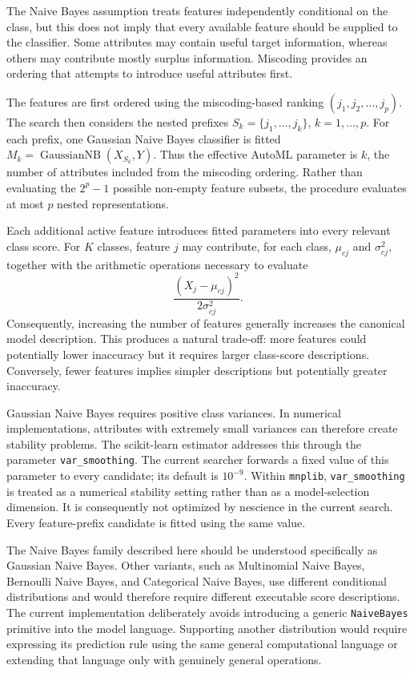 The Naive Bayes assumption treats features independently conditional on the class, but this does not imply that every available feature should be supplied to the classifier. Some attributes may contain useful target information, whereas others may contribute mostly surplus information. Miscoding provides an ordering that attempts to introduce useful attributes first.

The features are first ordered using the miscoding-based ranking $(j_1,j_2,\ldots,j_p)$. The search then considers the nested prefixes $S_k = \{j_1,\ldots,j_k\}$, $k=1,\ldots,p$. For each prefix, one Gaussian Naive Bayes classifier is fitted $M_k = \operatorname{GaussianNB}(X_{S_k},Y)$. Thus the effective AutoML parameter is $k$, the number of attributes included from the miscoding ordering. Rather than evaluating the  $2^p-1$ possible non-empty feature subsets, the procedure evaluates at most $p$ nested representations.

Each additional active feature introduces fitted parameters into every relevant class score. For $K$ classes, feature \(j\) may contribute, for each class, $\mu_{cj}$ and $\sigma_{cj}^{2}$, together with the arithmetic operations necessary to evaluate
\[
\frac{(X_j-\mu_{cj})^2}{2\sigma_{cj}^{2}}.
\]
Consequently, increasing the number of features generally increases the canonical model description. This produces a natural trade-off: more features could potentially lower inaccuracy but it requires larger class-score descriptions. Conversely, fewer features implies simpler descriptions but potentially greater inaccuracy.

Gaussian Naive Bayes requires positive class variances. In numerical implementations, attributes with extremely small variances can therefore create stability problems. The scikit-learn estimator addresses this through the parameter \texttt{var\_smoothing}. The current searcher forwards a fixed value of this parameter to every candidate; its default is $10^{-9}$. Within \texttt{mnplib}, \texttt{var\_smoothing} is treated as a numerical
stability setting rather than as a model-selection dimension. It is consequently not optimized by nescience in the current search. Every feature-prefix candidate is fitted using the same value.

The Naive Bayes family described here should be understood specifically as Gaussian Naive Bayes. Other variants, such as Multinomial Naive Bayes, Bernoulli Naive Bayes, and Categorical Naive Bayes, use different conditional distributions and would therefore require different executable score descriptions. The current implementation deliberately avoids introducing a generic \texttt{NaiveBayes} primitive into the model language. Supporting another distribution would require expressing its prediction rule using the same general computational language or extending that language only with genuinely general operations.

